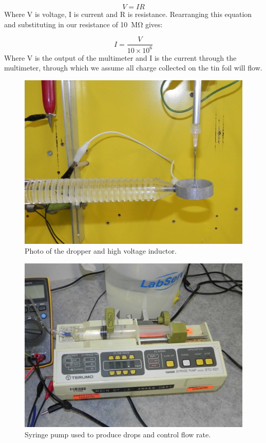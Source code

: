 \begin{equation}
V=IR
\end{equation}
Where V is voltage, I is current and R is resistance.
Rearranging this equation and substituting in our resistance of \SI{10}{\mega\ohm} gives:

\begin{equation}
I=\frac{V}{10\times10^{6}}
\end{equation}
Where V is the output of the multimeter and I is the current through
the multimeter, through which we assume all charge collected on the
tin foil will flow.

\begin{figure}
    \centering
    \includegraphics[scale=0.15]{content/appendices/chargedWaterDrops/graphics/Photo_dripperExperiment_Inductor_draft.JPG}
    \caption{Photo of the dropper and high voltage inductor.}
    \label{Photo_dripperExperiment_Inductor}
\end{figure}

\begin{figure}
    \centering
    \includegraphics[scale=0.15]{content/appendices/chargedWaterDrops/graphics/Photo_dripperExperiment_SyringePump_draft.JPG}
    \caption{\label{Photo_dripperExperiment_SyringePump}Syringe pump used to produce drops and control flow rate.}
\end{figure}

